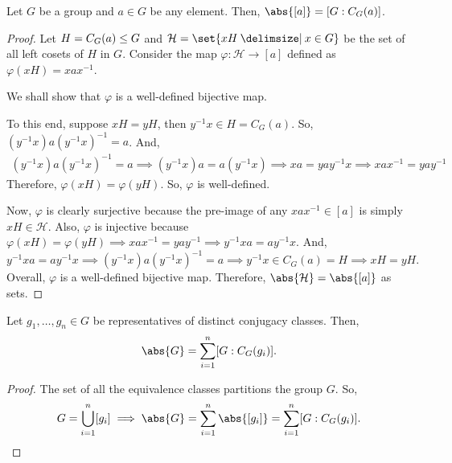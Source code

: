 \documentclass[11pt]{penrose}
\begin{document}
\begin{nthm}
    Let $G$ be a group and $a \in G$ be any element. Then, $\abs{[a]} = [G : C_{G}(a)]$.
\end{nthm}
\begin{proof}
    Let $H = C_{G}(a) \mathrel{\leq} G$ and $\mathcal{H} = \set{xH \st x \in G}$ be the set of all left cosets of $H$ in $G$. Consider the map $\varphi : \mathcal{H} \to [a]$ defined as $\varphi(xH) = x a x^{-1}$.

    We shall show that $\varphi$ is a well-defined bijective map.

    To this end, suppose $xH = yH$, then $y^{-1} x \in H = C_{G}(a)$. So, $(y^{-1} x) a (y^{-1} x)^{-1} = a$. And,
    \begin{align*}
        (y^{-1} x) a (y^{-1} x)^{-1} = a
        \implies
        (y^{-1} x) a = a (y^{-1} x)
        \implies
        xa = yay^{-1} x
        \implies
        xax^{-1} = yay^{-1}
    \end{align*}
    Therefore, $\varphi(xH) = \varphi(yH)$. So, $\varphi$ is well-defined.

    Now, $\varphi$ is clearly surjective because the pre-image of any $x a x^{-1} \in [a]$ is simply $xH \in \mathcal{H}$. Also, $\varphi$ is injective because $\varphi(xH) = \varphi(yH) \implies xax^{-1} = yay^{-1} \implies y^{-1} x a = a y^{-1} x$. And,
    \begin{equation*}
        y^{-1} x a = a y^{-1} x
        \implies
        (y^{-1} x) a (y^{-1} x)^{-1} = a
        \implies
        y^{-1} x \in C_{G}(a) = H
        \implies
        xH = yH.
    \end{equation*}
    Overall, $\varphi$ is a well-defined bijective map. Therefore, $\abs{ \mathcal{H} } = \abs{ [a] }$ as sets.
\end{proof}

\begin{nthm}
    Let $g_{1}, \dots, g_{n} \in G$ be representatives of distinct conjugacy classes. Then,
    \begin{equation*}
        \abs{G} = \sum_{i=1}^{n} [G : C_{G}(g_{i})].
    \end{equation*}
\end{nthm}
\begin{proof}
    The set of all the equivalence classes partitions the group $G$. So,
    \begin{equation*}
        G = \bigcup_{i = 1}^{n} [g_{i}]
        \implies \abs{G} = \sum_{i = 1}^{n} \abs{[g_{i}]} = \sum_{i = 1}^{n} [G : C_{G}(g_{i})].
        \qedhere
    \end{equation*}
\end{proof}
\end{document}
